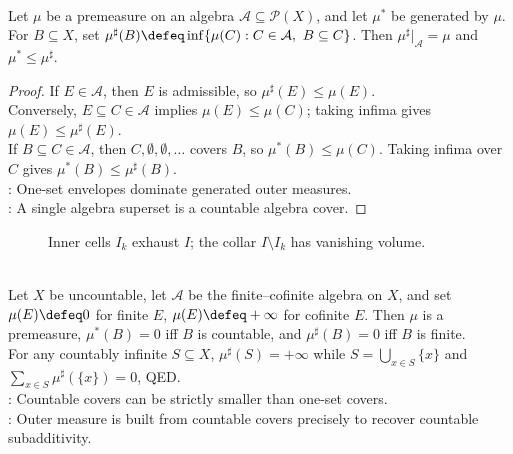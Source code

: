 \begin{proposition} \label{prop:single-set-envelope-vs-generated-outer-measure} \\
Let $\mu$ be a premeasure on an algebra $\mathcal{A}\subseteq\mathcal{P}(X)$, and let $\mu^\ast$ be generated by $\mu$. For $B\subseteq X$, set $\mu^\sharp(B)\defeq\inf\{\mu(C):C\in\mathcal{A},\ B\subseteq C\}$. Then $\mu^\sharp|_{\mathcal{A}}=\mu$ and $\mu^\ast\leq\mu^\sharp$.
\begin{proof} If $E\in\mathcal{A}$, then $E$ is admissible, so $\mu^\sharp(E)\leq\mu(E)$. \\
Conversely, $E\subseteq C\in\mathcal{A}$ implies $\mu(E)\leq\mu(C)$; taking infima gives $\mu(E)\leq\mu^\sharp(E)$.\\
If $B\subseteq C\in\mathcal{A}$, then $C,\emptyset,\emptyset,\ldots$ covers $B$, so $\mu^\ast(B)\leq\mu(C)$. Taking infima over $C$ gives $\mu^\ast(B)\leq\mu^\sharp(B)$.\\
: One-set envelopes dominate generated outer measures.\\
: A single algebra superset is a countable algebra cover.
\end{proof}
\end{proposition}

\begin{figure}[H]
  \centering
  
  \caption{Inner cells $I_k$ exhaust $I$; the collar $I\setminus I_k$ has vanishing volume.}
  \label{fig:open-cell-inner-shrink}
\end{figure}

\begin{example} \label{ex:single-set-envelope-not-outer-measure} \\
Let $X$ be uncountable, let $\mathcal{A}$ be the finite--cofinite algebra on $X$, and set $\mu(E)\defeq0$ for finite $E$, $\mu(E)\defeq+\infty$ for cofinite $E$. Then $\mu$ is a premeasure, $\mu^\ast(B)=0$ iff $B$ is countable, and $\mu^\sharp(B)=0$ iff $B$ is finite.\\
For any countably infinite $S\subseteq X$, $\mu^\sharp(S)=+\infty$ while $S=\bigcup_{x\in S}\{x\}$ and $\sum_{x\in S}\mu^\sharp(\{x\})=0$, QED.\\
: Countable covers can be strictly smaller than one-set covers.\\
: Outer measure is built from countable covers precisely to recover countable subadditivity.
\end{example}

